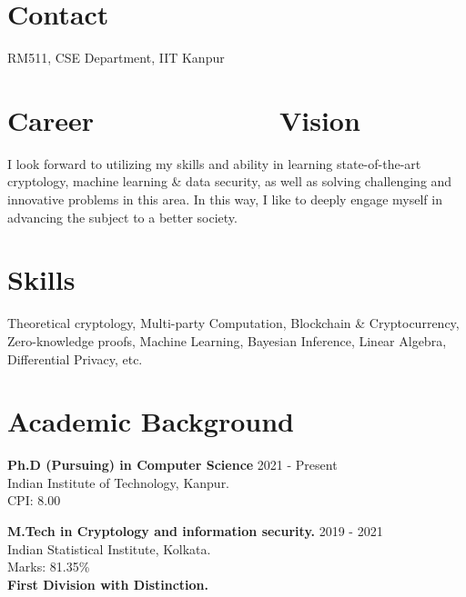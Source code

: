 \documentclass[margin,line]{res}
\newcommand{\cvlink}[2]{\hspace{0.3em}\href{#2}{#1}}
\begin{document}

\begin{resume}
\section{\sc Contact}
RM511, CSE Department, IIT Kanpur\hfill
{\large
\cvlink{\faEnvelope}{mailto:sarbajitg@cse.iitk.ac.in}
\cvlink{\faGlobe}{https://ghosh-sarbajit.github.io/}
\cvlink{}{https://scholar.google.com/citations?user=AVrr4S8AAAAJ}
\cvlink{}{https://www.semanticscholar.org/author/Sarbajit-Ghosh/152709675}
\cvlink{}{https://dblp.org/pid/350/8503.html}
\cvlink{}{https://www.scopus.com/authid/detail.uri?authorId=58102872800}
\cvlink{}{https://orcid.org/0009-0008-2477-586X}
\cvlink{\faGithub}{https://github.com/ghosh-sarbajit}
\cvlink{\faLinkedin}{https://www.linkedin.com/in/sarbajit-ghosh-a91b7a157/}}


\section{\sc Career ~~~~~~~~~~~~Vision}
I look forward to utilizing my skills and ability in learning state-of-the-art cryptology, machine learning \& data security, as well as solving challenging and innovative problems in this area. In this way, I like to deeply engage myself in advancing the subject to a better society.


\section{\sc Skills}
Theoretical cryptology, Multi-party Computation, Blockchain \& Cryptocurrency, Zero-knowledge proofs, Machine Learning, Bayesian Inference, Linear Algebra, Differential Privacy, etc.





\section{\sc Academic Background}

{\bf Ph.D (Pursuing) in Computer Science}  \hfill{2021 - Present}\\
Indian Institute of Technology, Kanpur.\\
CPI: 8.00

{\bf M.Tech in Cryptology and information security.}  \hfill{2019 - 2021}\\
Indian Statistical Institute, Kolkata.\\ 
Marks: 81.35\%\\
{\bf First Division with Distinction.}




\end{resume}
\end{document}
